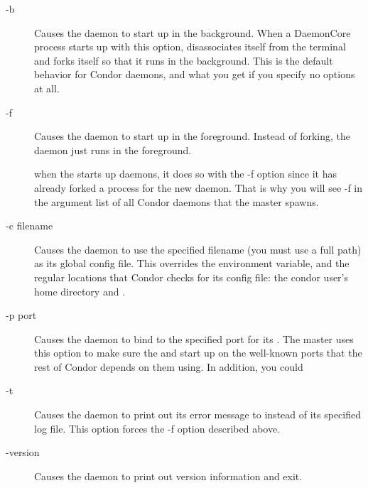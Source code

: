 \begin{description}

\item[-b] Causes the daemon to start up in the background.  When a
  DaemonCore process starts up with this option, disassociates itself
  from the terminal and forks itself so that it runs in the
  background.  This is the default behavior for Condor daemons, and
  what you get if you specify no options at all.

\item[-f] Causes the daemon to start up in the foreground.  Instead of
  forking, the daemon just runs in the foreground.  

  \Note when the  starts up daemons, it does
  so with the -f option since it has already forked a process for the
  new daemon.  That is why you will see -f in the argument list of all
  Condor daemons that the master spawns.

\item[-c filename] Causes the daemon to use the specified filename
  (you must use a full path) as its global config file.  This
  overrides the  environment variable, and the
  regular locations that Condor checks for its config file: the condor
  user's home directory and .  

\item[-p port] Causes the daemon to bind to the specified port for its
  .  The master uses this option to make sure the
   and  start up on the
  well-known ports that the rest of Condor depends on them using.  In
  addition, you could

\item[-t] Causes the daemon to print out its error message to
   instead of its specified log file.  This option forces
  the -f option described above.

\item[-version] Causes the daemon to print out version information and
  exit.

\end{description}

